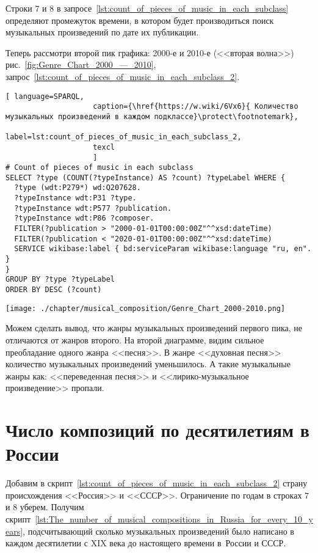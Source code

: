 Строки 7 и 8 в запросе~\ref{lst:count_of_pieces_of_music_in_each_subclass} определяют промежуток времени, в котором будет производиться поиск музыкальных произведений по дате их публикации.


Теперь рассмотри второй пик графика: 2000-е и 2010-е (<<вторая волна>>) рис.~\ref{fig:Genre_Chart_2000_—_2010}, запрос~\ref{lst:count_of_pieces_of_music_in_each_subclass_2}.

\begin{lstlisting}[ language=SPARQL,
                    caption={\href{https://w.wiki/6Vx6}{ Количество музыкальных произведений в каждом подклассе}\protect\footnotemark},
                    label=lst:count_of_pieces_of_music_in_each_subclass_2,
                    texcl 
                    ]
# Count of pieces of music in each subclass
SELECT ?type (COUNT(?typeInstance) AS ?count) ?typeLabel WHERE {
  ?type (wdt:P279*) wd:Q207628.
  ?typeInstance wdt:P31 ?type.
  ?typeInstance wdt:P577 ?publication.
  ?typeInstance wdt:P86 ?composer.
  FILTER(?publication > "2000-01-01T00:00:00Z"^^xsd:dateTime)        
  FILTER(?publication < "2020-01-01T00:00:00Z"^^xsd:dateTime)
  SERVICE wikibase:label { bd:serviceParam wikibase:language "ru, en". }
}
GROUP BY ?type ?typeLabel
ORDER BY DESC (?count)
\end{lstlisting}%

\begin{marginfigure}[0\baselineskip]
	\texttt{[image: ./chapter/musical\_composition/Genre\_Chart\_2000-2010.png]}
	\caption[Круговая диаграмма музыкальных жанров за 2000--2010 годы во всем мире]{Круговая диаграмма музыкальных жанров за 2000--2010 годы во всем мире. Ссылка на SPARQL-запрос: \href{https://w.wiki/6Vx6}{https://w.wiki/6Vx6}.}%
	\label{fig:Genre_Chart_2000_—_2010}%
\end{marginfigure}

Можем сделать вывод, что жанры музыкальных произведений первого пика, не отличаются от жанров второго. На второй диаграмме, видим сильное преобладание одного жанра <<песня>>. В жанре <<духовная песня>> количество музыкальных произведений уменьшилось. А такие музыкальные жанры как: <<переведенная песня>> и <<лирико-музыкальное произведение>> пропали.

\section{Число композиций по десятилетиям в России}
Добавим в скрипт~\ref{lst:count_of_pieces_of_music_in_each_subclass_2} страну происхождения <<Россия>> и <<СССР>>. Ограничение по годам в строках 7 и 8 уберем. Получим скрипт~\ref{lst:The_number_of_musical_compositions_in_Russia_for_every_10_years}, подсчитывающий сколько музыкальных произведений было написано в каждом десятилетии с XIX века до настоящего времени в~России и СССР.

